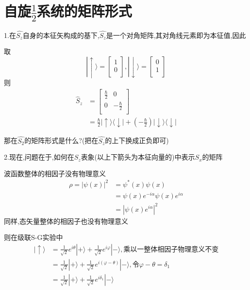 \documentclass[lang=cn,10pt]{elegantbook}
\begin{document}
 \section{自旋$\frac{1}{2}$系统的矩阵形式}
 
 1.在$\hat{S_z}$自身的本征矢构成的基下,$\hat{S_z}$是一个对角矩阵,其对角线元素即为本征值,因此

 取\begin{equation*}
 	|\uparrow \rangle =\left[ \begin{array}{c}
 		1\\
 		0\\
 	\end{array} \right] ,|\downarrow \rangle =\left[ \begin{array}{c}
 		0\\
 		1\\
 	\end{array} \right] 
 \end{equation*}
 则\begin{equation*}
 	\begin{split}
 		\hat{S}_z&=\left[ \begin{matrix}
 			\frac{\hbar}{2}&		0\\
 			0&		-\frac{\hbar}{2}\\
 		\end{matrix} \right] 
 		\\
 		&=\frac{\hbar}{2}|\uparrow \rangle \langle \downarrow |+\left( -\frac{\hbar}{2} \right) |\downarrow \rangle \langle \downarrow |
 	\end{split}
 \end{equation*}
 
 那在$\hat{S_2}$的矩阵形式是什么?(把在$\hat{S_z}$的上下换成正负即可)
 
 2.现在,问题在于,如何在$S_z $表象(以上下箭头为本征向量的)中表示$S_x $的矩阵
 
 波函数整体的相因子没有物理意义
 \begin{equation*}
 	\begin{split}
 		\rho =|\psi \left( x \right) |^2&=\psi ^*\left( x \right) \psi \left( x \right) 
 		\\
 		&=\psi \left( x \right) e^{-i\alpha}\psi \left( x \right) e^{i\alpha}
 		\\
 		&=|\psi \left( x \right) e^{i\alpha}|^2
 	\end{split}
 \end{equation*}
 同样,态矢量整体的相因子也没有物理意义
 
 则在级联S-G实验中
 \begin{equation*}
 	\begin{split}
 		|\uparrow \rangle &=\frac{1}{\sqrt{2}}e^{i\theta}|+\rangle +\frac{1}{\sqrt{2}}e^{i\varphi}|-\rangle ,\text{乘以一整体相因子物理意义不变}
 		\\
 		&=\frac{1}{\sqrt{2}}|+\rangle +\frac{1}{\sqrt{2}}e^{i\left( \varphi -\theta \right)}|-\rangle ,\text{令}\varphi -\theta =\delta _1
 		\\
 		&=\frac{1}{\sqrt{2}}|+\rangle +\frac{1}{\sqrt{2}}e^{i\delta _1}|-\rangle 
 	\end{split}
 \end{equation*}
 
\end{document}
